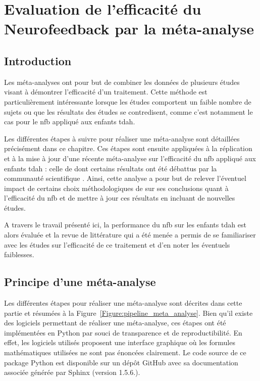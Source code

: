 \chapter{Evaluation de l'efficacité du Neurofeedback par la méta-analyse} \label{chapitre-2}

\section*{Introduction}
Les méta-analyses ont pour but de combiner les données de plusieurs études visant à démontrer l'efficacité d'un traitement. Cette méthode est
particulièrement intéressante lorsque les études comportent un faible nombre de sujets ou que les résultats des études se contredisent, comme c'est notamment le cas
pour le \gls{nfb} appliqué aux enfants \gls{tdah}. 

Les différentes étapes à suivre pour réaliser une méta-analyse sont détaillées précisément dans ce chapitre.
Ces étapes sont ensuite appliquées à la réplication et à la mise à jour d'une récente méta-analyse sur l'efficacité du \gls{nfb} appliqué aux enfants \gls{tdah} :
celle de \citet{Cortese2016} dont certains résultats ont été débattus par la communauté scientifique \citep{Micoulaud2016}. Ainsi, cette analyse a pour but
de relever l'éventuel impact de certains choix méthodologiques de \citet{Cortese2016} sur ses conclusions quant à l'efficacité du \gls{nfb} et de mettre à jour
ces résultats en incluant de nouvelles études. 

A travers le travail présenté ici, la performance du \gls{nfb} sur les enfants \gls{tdah} est alors évaluée et la revue de littérature
qui a été menée a permis de se familiariser avec les études sur l'efficacité de ce traitement et d'en noter les éventuels faiblesses.

\clearpage

\section{Principe d'une méta-analyse} \label{methods}

Les différentes étapes pour réaliser une méta-analyse sont décrites dans cette partie et résumées à la Figure~\ref{Figure:pipeline_meta_analyse}. 
Bien qu'il existe des logiciels permettant de réaliser une méta-analyse, ces étapes ont été implémentées en Python par souci de transparence et de reproductibilité. 
En effet, les logiciels utilisés proposent une interface graphique où les formules mathématiques utilisées ne sont pas énoncées clairement. Le code source de ce package 
Python est disponible sur un dépôt GitHub \citep{Bussalb2019clinical} avec sa documentation associée générée par Sphinx (version 1.5.6.).


